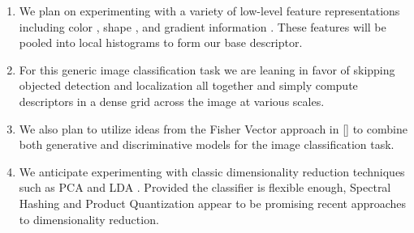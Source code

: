 \documentclass[12pt]{article}
\begin{document}
\begin{enumerate}

\item We plan on experimenting with a variety of low-level feature representations including color \cite{sande10}, shape \cite{ahonen06}, and gradient information \cite{lowe04,dalal05}. These features will be pooled into local histograms to form our base descriptor.

\item For this generic image classification task we are leaning in favor of skipping objected detection and localization all together and simply compute descriptors in a dense grid across the image at various scales.

\item  We also plan to utilize ideas from the Fisher Vector approach in [] to combine both generative and discriminative models for the image classification task.

\item We anticipate experimenting with classic dimensionality reduction techniques such as PCA \cite{turk91} and LDA \cite{belhumeur97}. Provided the classifier is flexible enough, Spectral Hashing \cite{weiss2008} and Product Quantization \cite{jegou2011} appear to be promising recent approaches to dimensionality reduction.



\end{enumerate}



\end{document}
